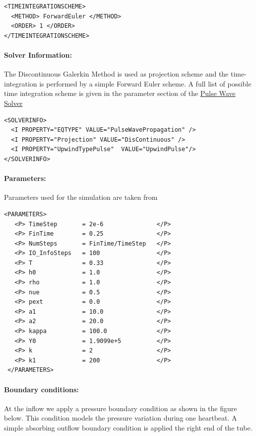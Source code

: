 \begin{lstlisting}[style=XMLStyle] 
<TIMEINTEGRATIONSCHEME>
  <METHOD> ForwardEuler </METHOD>
  <ORDER> 1 </ORDER>
</TIMEINTEGRATIONSCHEME>
\end{lstlisting}
        
\paragraph{Solver Information:~}The Discontinuous Galerkin Method is used as projection scheme and the time-integration is performed by a simple Forward Euler scheme. A full list of possible time integration scheme is given in the parameter section of the  \hyperref[PulseWaveSolver]{Pulse Wave Solver}
\begin{lstlisting}[style=XMLStyle]
<SOLVERINFO>
  <I PROPERTY="EQTYPE" VALUE="PulseWavePropagation" />
  <I PROPERTY="Projection" VALUE="DisContinuous" />
  <I PROPERTY="UpwindTypePulse"  VALUE="UpwindPulse"/>
</SOLVERINFO>
\end{lstlisting}

\paragraph{Parameters:~} Parameters used for the simulation are taken from \cite{ShFoPeFr03}
\begin{lstlisting}[style=XMLStyle]
<PARAMETERS>
   <P> TimeStep       = 2e-6               </P>
   <P> FinTime        = 0.25               </P>
   <P> NumSteps       = FinTime/TimeStep   </P>
   <P> IO_InfoSteps   = 100                </P>
   <P> T              = 0.33               </P>
   <P> h0             = 1.0                </P>
   <P> rho            = 1.0                </P>
   <P> nue            = 0.5                </P>
   <P> pext           = 0.0                </P>
   <P> a1             = 10.0               </P>
   <P> a2             = 20.0               </P>
   <P> kappa          = 100.0              </P>
   <P> Y0             = 1.9099e+5          </P>
   <P> k              = 2                  </P>
   <P> k1             = 200                </P>
 </PARAMETERS>
\end{lstlisting}

\paragraph{Boundary conditions:~} At the inflow we apply a pressure boundary condition as shown in the figure below. This condition models the pressure variation during one heartbeat. A simple absorbing outflow boundary condition is applied the right end of the tube.

